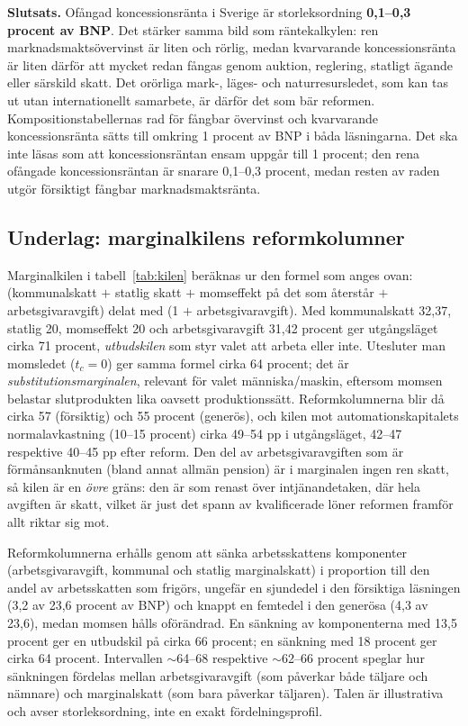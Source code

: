 \documentclass[11pt]{article}
\begin{document}
\textbf{Slutsats.} Ofångad koncessionsränta i Sverige är storleksordning \textbf{0,1--0,3 procent av BNP}. Det stärker samma bild som räntekalkylen: ren marknadsmaktsövervinst är liten och rörlig, medan kvarvarande koncessionsränta är liten därför att mycket redan fångas genom auktion, reglering, statligt ägande eller särskild skatt. Det orörliga mark-, läges- och naturresursledet, som kan tas ut utan internationellt samarbete, är därför det som bär reformen. Kompositionstabellernas rad för fångbar övervinst och kvarvarande koncessionsränta sätts till omkring 1 procent av BNP i båda läsningarna. Det ska inte läsas som att koncessionsräntan ensam uppgår till 1 procent; den rena ofångade koncessionsräntan är snarare 0,1--0,3 procent, medan resten av raden utgör försiktigt fångbar marknadsmaktsränta.

\subsection*{Underlag: marginalkilens reformkolumner}

Marginalkilen i tabell~\ref{tab:kilen} beräknas ur den formel som anges ovan: (kommunalskatt $+$ statlig skatt $+$ momseffekt på det som återstår $+$ arbetsgivaravgift) delat med (1 $+$ arbetsgivaravgift). Med kommunalskatt 32,37, statlig 20, momseffekt 20 och arbetsgivaravgift 31,42 procent ger utgångsläget cirka 71 procent, \emph{utbudskilen} som styr valet att arbeta eller inte. Utesluter man momsledet ($t_c=0$) ger samma formel cirka 64 procent; det är \emph{substitutionsmarginalen}, relevant för valet människa/maskin, eftersom momsen belastar slutprodukten lika oavsett produktionssätt. Reformkolumnerna blir då cirka 57 (försiktig) och 55 procent (generös), och kilen mot automationskapitalets normalavkastning (10--15 procent) cirka 49--54 pp i utgångsläget, 42--47 respektive 40--45 pp efter reform. Den del av arbetsgivaravgiften som är förmånsanknuten (bland annat allmän pension) är i marginalen ingen ren skatt, så kilen är en \emph{övre} gräns: den är som renast över intjänandetaken, där hela avgiften är skatt, vilket är just det spann av kvalificerade löner reformen framför allt riktar sig mot.

Reformkolumnerna erhålls genom att sänka arbetsskattens komponenter (arbetsgivaravgift, kommunal och statlig marginalskatt) i proportion till den andel av arbetsskatten som frigörs, ungefär en sjundedel i den försiktiga läsningen (3,2 av 23,6 procent av BNP) och knappt en femtedel i den generösa (4,3 av 23,6), medan momsen hålls oförändrad. En sänkning av komponenterna med 13,5 procent ger en utbudskil på cirka 66 procent; en sänkning med 18 procent ger cirka 64 procent. Intervallen $\sim$64--68 respektive $\sim$62--66 procent speglar hur sänkningen fördelas mellan arbetsgivaravgift (som påverkar både täljare och nämnare) och marginalskatt (som bara påverkar täljaren). Talen är illustrativa och avser storleksordning, inte en exakt fördelningsprofil.
\end{document}
